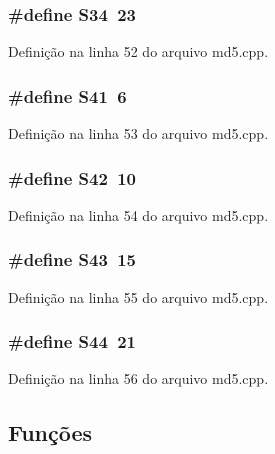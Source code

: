 \subsubsection[{S34}]{\setlength{\rightskip}{0pt plus 5cm}\#define S34~23}\label{md5_8cpp_af6472be1d535970afee8e5266a74aa07}


Definição na linha 52 do arquivo md5.\+cpp.

\subsubsection[{S41}]{\setlength{\rightskip}{0pt plus 5cm}\#define S41~6}\label{md5_8cpp_ab674ba129e588da55d1d494e1cf3c15e}


Definição na linha 53 do arquivo md5.\+cpp.

\subsubsection[{S42}]{\setlength{\rightskip}{0pt plus 5cm}\#define S42~10}\label{md5_8cpp_a268ef1a49114a94b931cc6b313e3cd1b}


Definição na linha 54 do arquivo md5.\+cpp.

\subsubsection[{S43}]{\setlength{\rightskip}{0pt plus 5cm}\#define S43~15}\label{md5_8cpp_a5aaa7121f39650d472746942ca68f959}


Definição na linha 55 do arquivo md5.\+cpp.

\subsubsection[{S44}]{\setlength{\rightskip}{0pt plus 5cm}\#define S44~21}\label{md5_8cpp_a6a3989af72b55d169bd73a66f8620aae}


Definição na linha 56 do arquivo md5.\+cpp.



\subsection{Funções}
